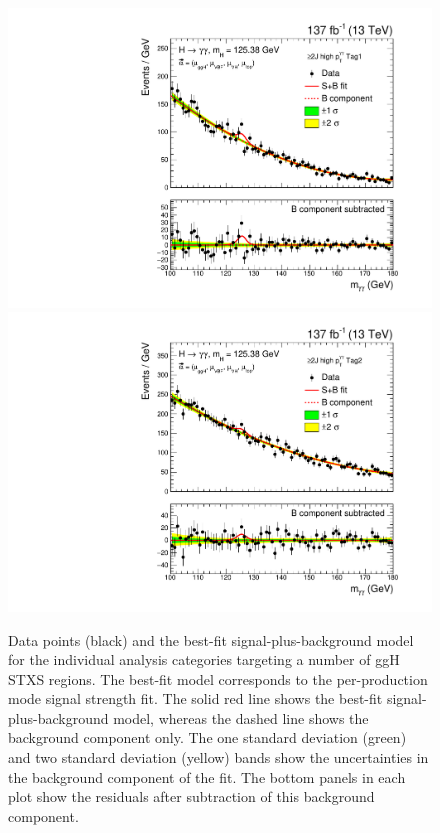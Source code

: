 \begin{figure}[htbp]
  \includegraphics[width=.32\linewidth]{Figures/app_sb_models/RECO_GE2J_PTH_120_200_Tag1_CMS_hgg_mass.pdf}
  \includegraphics[width=.32\linewidth]{Figures/app_sb_models/RECO_GE2J_PTH_120_200_Tag2_CMS_hgg_mass.pdf}
  \caption[Observed diphoton mass distributions: ggH 1J and ggH $\geq$2J]
  {
    Data points (black) and the best-fit signal-plus-background model for the individual analysis categories targeting a number of ggH STXS regions. The best-fit model corresponds to the per-production mode signal strength fit. The solid red line shows the best-fit signal-plus-background model, whereas the dashed line shows the background component only. The one standard deviation (green) and two standard deviation (yellow) bands show the uncertainties in the background component of the fit. The bottom panels in each plot show the residuals after subtraction of this background component.
  }
  \label{fig:diphoton_mass_1}
\end{figure}


